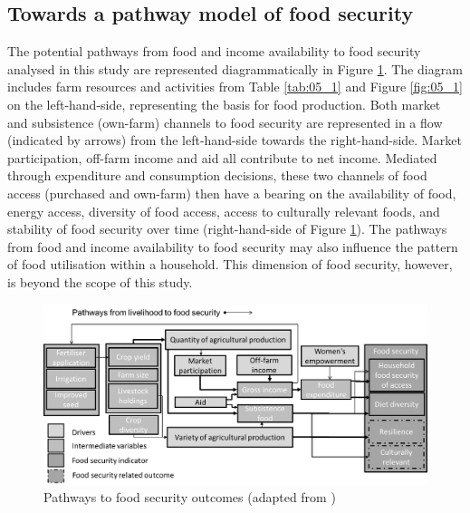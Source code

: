 \subsection{Towards a pathway model of food security}

The potential pathways from food and income availability to food security analysed in this study are represented diagrammatically in Figure \ref{fig:05_3}. The diagram includes farm resources and activities from Table \ref{tab:05_1} and Figure \ref{fig:05_1} on the left-hand-side, representing the basis for food production. Both market and subsistence (own-farm) channels to food security are represented in a flow (indicated by arrows) from the left-hand-side towards the right-hand-side. Market participation, off-farm income and aid all contribute to net income. Mediated through expenditure and consumption decisions, these two channels of food access (purchased and own-farm) then have a bearing on the availability of food, energy access, diversity of food access, access to culturally relevant foods, and stability of food security over time (right-hand-side of Figure \ref{fig:05_3}). The pathways from food and income availability to food security may also influence the pattern of food utilisation within a household. This dimension of food security, however, is beyond the scope of this study.

\begin{figure}[H]
  \captionsetup{singlelinecheck = false, justification=justified}
  \includegraphics[width=1\textwidth]{figs_05/image4.png}
  \caption{Pathways to food security outcomes (adapted from \citealp{Jones2016})}
  \label{fig:05_3}
\end{figure}

